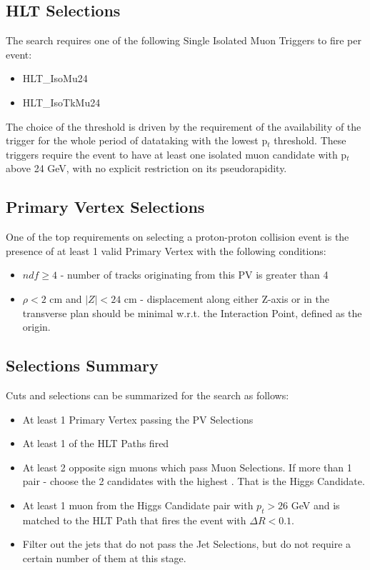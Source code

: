 \subsection{HLT Selections}
The search requires one of the following Single Isolated Muon Triggers to fire per event:
\begin{itemize}
  \item HLT\_IsoMu24
  \item HLT\_IsoTkMu24
\end{itemize}
The choice of the threshold is driven by the requirement of the availability of the trigger for the whole period of datataking with the lowest p$_t$ threshold. These triggers require the event to have at least one isolated muon candidate with p$_t$ above 24 GeV, with no explicit restriction on its pseudorapidity.

\subsection{Primary Vertex Selections}
One of the top requirements on selecting a proton-proton collision event is the presence of at least 1 valid Primary Vertex with the following conditions:
\begin{itemize}
  \item $ndf \ge 4$ - number of tracks originating from this PV is greater than 4
  \item $\rho < 2$ cm and $|Z| < 24$ cm - displacement along either Z-axis or in the transverse plan should be minimal w.r.t. the Interaction Point, defined as the origin.
\end{itemize}

\subsection{Selections Summary}
Cuts and selections can be summarized for the search as follows:
\begin{itemize}
  \item At least 1 Primary Vertex passing the PV Selections
  \item At least 1 of the HLT Paths fired
  \item At least 2 opposite sign muons which pass Muon Selections. If more than 1 pair - choose the 2 candidates with the highest \pt. That is the Higgs Candidate.
  \item At least 1 muon from the Higgs Candidate pair with $p_t > 26$ GeV and is matched to the HLT Path that fires the event with $\Delta R < 0.1$.
  \item Filter out the jets that do not pass the Jet Selections, but do not require a certain number of them at this stage.
\end{itemize}

